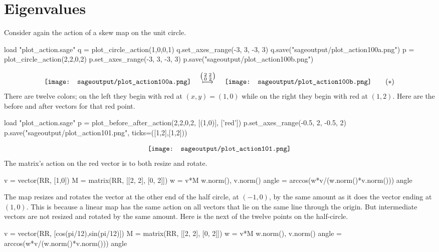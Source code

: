 \chapter{Eigenvalues}

Consider again the action of a skew map on the unit circle.
\begin{sageoutput}[d,0,4;d,5,7]
load "plot_action.sage"  
q = plot_circle_action(1,0,0,1) 
q.set_axes_range(-3, 3, -3, 3) 
q.save("sageoutput/plot_action100a.png")
p = plot_circle_action(2,2,0,2) 
p.set_axes_range(-3, 3, -3, 3) 
p.save("sageoutput/plot_action100b.png")
\end{sageoutput}
\begin{equation*}
  \vcenteredhbox{\texttt{[image: sageoutput/plot\_action100a.png]}}
  \quad\mapsunder{\big (\begin{smallmatrix} 2 &2 \\ 0 &2 \end{smallmatrix}\big )}\quad
  \vcenteredhbox{\texttt{[image: sageoutput/plot\_action100b.png]}}
  \tag{$*$}
\end{equation*}
There are twelve colors;
on the left they begin with red at $(x,y)=(1,0)$
while on the right they begin with red at $(1,2)$.
Here are the before and after vectors for that red point.
\begin{sageoutput}[d,0,1;d,2,4]
load "plot_action.sage"  
p = plot_before_after_action(2,2,0,2, [(1,0)], ['red']) 
p.set_axes_range(-0.5, 2, -0.5, 2) 
p.save("sageoutput/plot_action101.png", ticks=([1,2],[1,2]))
\end{sageoutput}
\begin{equation*}
  \vcenteredhbox{\texttt{[image: sageoutput/plot\_action101.png]}}
\end{equation*}
The matrix's action on the red vector is to both resize and rotate.
\begin{sageoutput}
v = vector(RR, [1,0])
M = matrix(RR, [[2, 2], [0, 2]])
w = v*M
w.norm(), v.norm() 
angle = arccos(w*v/(w.norm()*v.norm())) 
angle 
\end{sageoutput}
\noindent The map resizes and rotates the vector at the other end of the 
half circle, at $(-1,0)$, by the
same amount as it does the vector ending at $(1,0)$. 
This is because a linear map has the same action on 
all vectors that lie on the same line through the origin.
But intermediate vectors are not resized and rotated by the same
amount.
Here is the next of the twelve points on the half-circle.
\begin{sageoutput}
v = vector(RR, [cos(pi/12),sin(pi/12)])
M = matrix(RR, [[2, 2], [0, 2]])
w = v*M
w.norm(), v.norm() 
angle = arccos(w*v/(w.norm()*v.norm())) 
angle 
\end{sageoutput}


